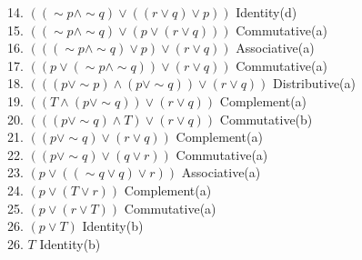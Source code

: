 \documentclass{article}
\begin{document}
14. $((\sim p \wedge \sim q) \vee ((r \vee q) \vee p))$ \hspace*{\fill} Identity(d) \\
15. $((\sim p \wedge \sim q) \vee (p \vee (r \vee q)))$ \hspace*{\fill} Commutative(a) \\
16. $(((\sim p \wedge \sim q) \vee p) \vee (r \vee q))$ \hspace*{\fill} Associative(a) \\
17. $((p \vee (\sim p \wedge \sim q)) \vee (r \vee q))$ \hspace*{\fill} Commutative(a) \\
18. $(((p \vee \sim p) \wedge(p \vee \sim q)) \vee (r \vee q))$ \hspace*{\fill} Distributive(a) \\
19. $((T \wedge(p \vee \sim q)) \vee (r \vee q))$ \hspace*{\fill} Complement(a) \\
20. $(((p \vee \sim q) \wedge T) \vee (r \vee q))$ \hspace*{\fill} Commutative(b) \\
21. $((p \vee \sim q) \vee (r \vee q))$ \hspace*{\fill} Complement(a) \\
22. $((p \vee \sim q) \vee (q \vee r))$ \hspace*{\fill} Commutative(a) \\
23. $(p \vee ((\sim q \vee q) \vee r))$ \hspace*{\fill} Associative(a) \\
24. $(p \vee (T \vee r))$ \hspace*{\fill} Complement(a) \\
25. $(p \vee (r \vee T))$ \hspace*{\fill} Commutative(a) \\
26. $(p \vee T)$ \hspace*{\fill} Identity(b) \\
26. $T$ \hspace*{\fill} Identity(b) \\
\end{document}
